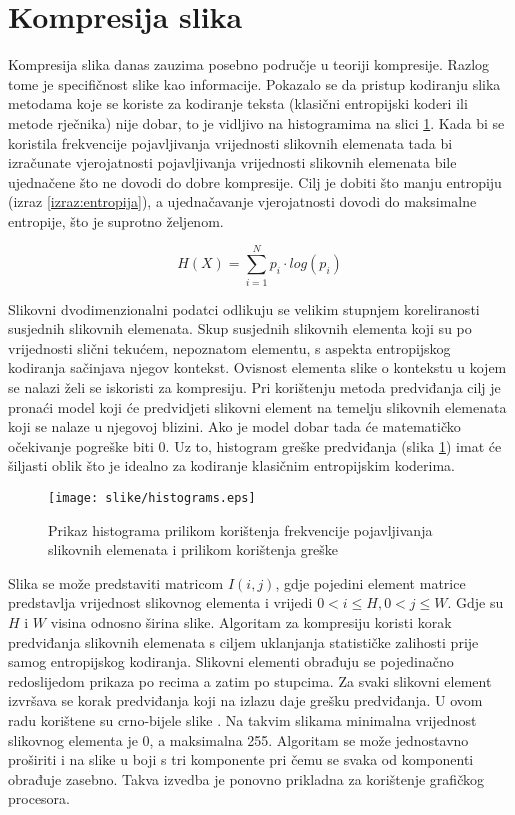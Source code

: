 \documentclass[times, utf8, zavrsni, numeric, sort]{fer}
\begin{document}
\section{Kompresija slika}
Kompresija slika danas zauzima posebno područje u teoriji kompresije. Razlog tome je specifičnost slike kao informacije. Pokazalo se da pristup kodiranju slika metodama koje se koriste za kodiranje teksta (klasični entropijski koderi ili metode rječnika) nije dobar, to je vidljivo na histogramima na slici \ref{fig:histogram}. Kada bi se koristila frekvencije pojavljivanja vrijednosti slikovnih elemenata tada bi izračunate vjerojatnosti pojavljivanja vrijednosti slikovnih elemenata bile ujednačene što ne dovodi do dobre kompresije. Cilj je dobiti što manju entropiju (izraz \ref{izraz:entropija}), a ujednačavanje vjerojatnosti dovodi do maksimalne entropije, što je suprotno željenom.

\begin{equation}
\label{izraz:entropija}
H(X) = \sum_{i=1}^{N} p_{i} \cdot log(p_{i})
\end{equation}

Slikovni dvodimenzionalni podatci odlikuju se velikim stupnjem koreliranosti susjednih slikovnih elemenata. Skup susjednih slikovnih elementa koji su po vrijednosti slični tekućem, nepoznatom elementu, s aspekta entropijskog kodiranja sačinjava njegov kontekst. Ovisnost elementa slike o kontekstu u kojem se nalazi želi se iskoristi za kompresiju. Pri korištenju metoda predviđanja cilj je pronaći model koji će predvidjeti slikovni element na temelju slikovnih elemenata koji se nalaze u njegovoj blizini. Ako je model dobar tada će matematičko očekivanje pogreške biti 0. Uz to, histogram greške predviđanja (slika \ref{fig:histogram}) imat će šiljasti oblik što je idealno za kodiranje klasičnim entropijskim koderima.


\begin{figure}[htb]
\centering
\texttt{[image: slike/histograms.eps]}
\caption{Prikaz histograma prilikom korištenja frekvencije pojavljivanja slikovnih elemenata i prilikom korištenja greške}
\label{fig:histogram}
\end{figure}

Slika se može predstaviti matricom $I(i,j)$, gdje pojedini element matrice predstavlja vrijednost slikovnog elementa i vrijedi $0<i\leqslant H, 0<j\leqslant W$. Gdje su $H$ i $W$ visina odnosno širina slike. Algoritam za kompresiju koristi korak predviđanja slikovnih elemenata s ciljem uklanjanja statističke zalihosti prije samog entropijskog kodiranja. Slikovni elementi obrađuju se pojedinačno redoslijedom prikaza po recima a zatim po stupcima. Za svaki slikovni element izvršava se korak predviđanja koji na izlazu daje grešku predviđanja.  U ovom radu korištene su crno-bijele slike . Na takvim slikama minimalna vrijednost slikovnog elementa je 0, a maksimalna 255. Algoritam se može jednostavno proširiti i na slike u boji s tri komponente pri čemu se svaka od komponenti obrađuje zasebno. Takva izvedba je ponovno prikladna za korištenje grafičkog procesora.
\end{document}
